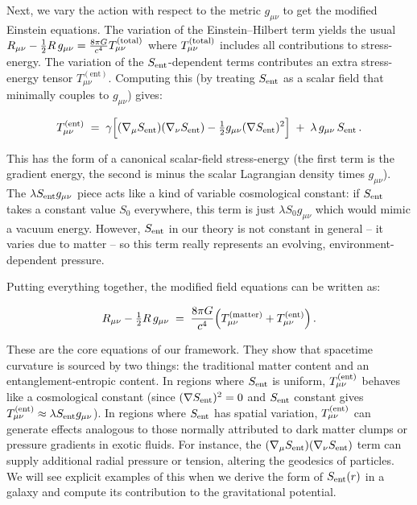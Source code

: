 \documentclass[11pt]{article}
\begin{document}
Next, we vary the action with respect to the metric $g_{\mu\nu}$ to get the modified Einstein equations. The variation of the Einstein–Hilbert term yields the usual $R_{\mu\nu}-\frac{1}{2}R\,g_{\mu\nu} = \frac{8\pi G}{c^4} T_{\mu\nu}^{\rm (total)}$ where $T_{\mu\nu}^{\rm (total)}$ includes all contributions to stress-energy. The variation of the $S_{\rm ent}$-dependent terms contributes an extra stress-energy tensor $T_{\mu\nu}^{(\text{ent})}$. Computing this (by treating $S_{\rm ent}$ as a scalar field that minimally couples to $g_{\mu\nu}$) gives: 

\begin{equation}
T_{\mu\nu}^{\rm (ent)} \;=\; \gamma\Big[(\nabla_\mu S_{\rm ent})(\nabla_\nu S_{\rm ent}) - \tfrac{1}{2}g_{\mu\nu}(\nabla S_{\rm ent})^2\Big] \;+\; \lambda\, g_{\mu\nu}\,S_{\rm ent} \,. \label{eq:T-ent} 
\end{equation}

This has the form of a canonical scalar-field stress-energy (the first term is the gradient energy, the second is minus the scalar Lagrangian density times $g_{\mu\nu}$). The $\lambda S_{\rm ent} g_{\mu\nu}$ piece acts like a kind of variable cosmological constant: if $S_{\rm ent}$ takes a constant value $S_0$ everywhere, this term is just $\lambda S_0 g_{\mu\nu}$ which would mimic a vacuum energy. However, $S_{\rm ent}$ in our theory is not constant in general – it varies due to matter – so this term really represents an evolving, environment-dependent pressure.

Putting everything together, the modified field equations can be written as: 

\begin{equation}
R_{\mu\nu} - \tfrac{1}{2}R\,g_{\mu\nu} \;=\; \frac{8\pi G}{c^4}\Big( T_{\mu\nu}^{\rm (matter)} + T_{\mu\nu}^{\rm (ent)} \Big)\,. 
\end{equation}

These are the core equations of our framework. They show that spacetime curvature is sourced by two things: the traditional matter content and an entanglement-entropic content. In regions where $S_{\rm ent}$ is uniform, $T_{\mu\nu}^{\rm (ent)}$ behaves like a cosmological constant (since $(\nabla S_{\rm ent})^2 = 0$ and $S_{\rm ent}$ constant gives $T_{\mu\nu}^{\rm (ent)} \approx \lambda S_{\rm ent} g_{\mu\nu}$). In regions where $S_{\rm ent}$ has spatial variation, $T_{\mu\nu}^{\rm (ent)}$ can generate effects analogous to those normally attributed to dark matter clumps or pressure gradients in exotic fluids. For instance, the $(\nabla_\mu S_{\rm ent})(\nabla_\nu S_{\rm ent})$ term can supply additional radial pressure or tension, altering the geodesics of particles. We will see explicit examples of this when we derive the form of $S_{\rm ent}(r)$ in a galaxy and compute its contribution to the gravitational potential.
\end{document}
